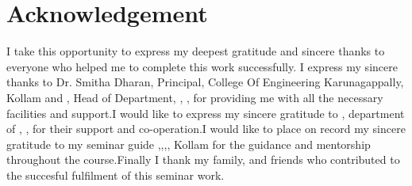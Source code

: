 \chapter*{Acknowledgement}%
%


I take this opportunity to express my deepest gratitude and sincere thanks to everyone who helped me to complete this work successfully. I express my sincere thanks to Dr. Smitha Dharan, Principal, College Of Engineering Karunagappally, Kollam and \hod, Head of Department, \dept, \college\hspace*{2pt} \collegeplace, \hspace*{2pt} for providing  me with all the necessary facilities and support.I would like to express my sincere gratitude to \guide, \hspace*{2pt}department of \hspace*{2pt} \dept, \hspace*{2pt} \college, \hspace*{2pt} \collegeplace \hspace*{2pt} for their support and co-operation.I would like to place on record my sincere gratitude to my seminar guide \guide,\hspace*{2pt}\guidedes,\hspace*{2pt}\dept,\hspace*{2pt}\college \hspace*{2pt}, Kollam for the guidance and mentorship throughout the course.Finally I thank my family, and friends who contributed to the succesful fulfilment of this seminar work.

\vspace*{30pt}
\begin{flushright}
	\textbf{\author}
\end{flushright}
\thispagestyle{plain}
